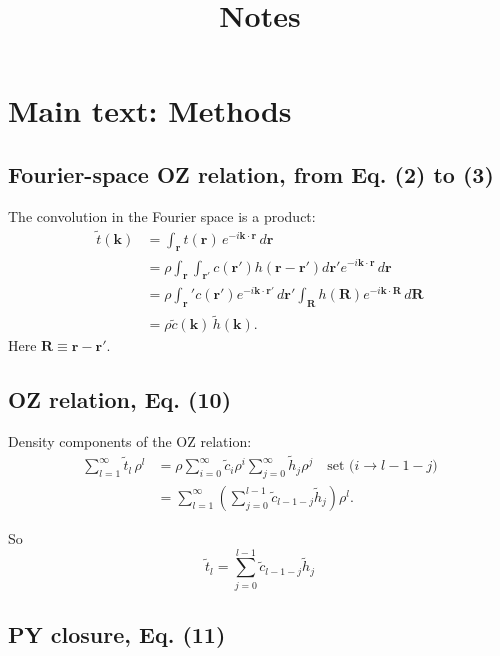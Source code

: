 \documentclass[aip,jcp,reprint,superscriptaddress]{revtex4-1}
\numberwithin{equation}{subsection}
\newcommand{\vct}[1]{\mathbf{#1}}
\providecommand{\vr}{} %
\renewcommand{\vr}{\vct{r}}
\newcommand{\vk}{\vct{k}}
\newcommand{\vR}{\vct{R}}
\begin{document}
\title{Notes}

\maketitle



\section{Main text: Methods}


\subsection{Fourier-space OZ relation, from Eq. (2) to (3)}

The convolution in the Fourier space is a product:
\begin{align*}
  \tilde{t}(\vk)
&= \int_\vr t(\vr) \, e^{-i\vk \cdot \vr} \, d\vr \\
&= \rho \int_\vr \int_{\vr'} c(\vr') h(\vr - \vr') d\vr' e^{-i\vk \cdot \vr} \, d\vr \\
&= \rho \int_\vr' c(\vr') e^{-i\vk \cdot \vr'} \, d\vr'
        \int_\vR h(\vR) e^{-i\vk \cdot \vR} \, d\vR \\
&= \rho \tilde{c}(\vk) \, \tilde{h}(\vk).
\end{align*}
%
Here $\vR \equiv \vr - \vr'$.



\subsection{OZ relation, Eq. (10)}

Density components of the OZ relation:
\begin{align*}
  \sum_{l = 1}^{\infty} \tilde{t}_l \, \rho^l
  &=
  \rho \sum_{i = 0}^{\infty} \tilde{c}_i \rho^i
  \sum_{j = 0}^{\infty} \tilde{h}_j \rho^j
  \quad \mbox{set ($i \rightarrow l - 1 - j$)}
  \\
  &=
  \sum_{l = 1}^{\infty}
  \left(
  \sum_{j = 0}^{l-1}
    \tilde{c}_{l-1-j} \tilde{h}_j \right) \rho^l.
\end{align*}

So
\begin{equation}
  \tilde{t}_l = \sum_{j = 0}^{l - 1}
  \tilde{c}_{l-1-j} \tilde{h}_j
  \tag{10}
\end{equation}



\subsection{PY closure, Eq. (11)}
\end{document}
